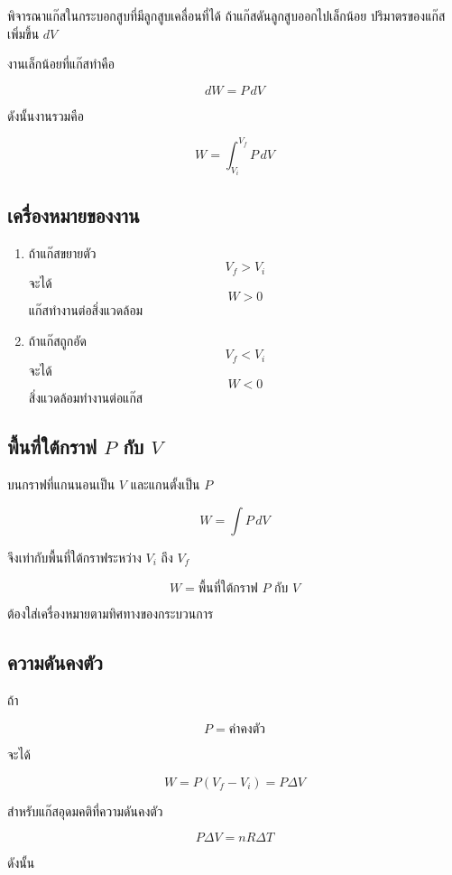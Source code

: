 พิจารณาแก๊สในกระบอกสูบที่มีลูกสูบเคลื่อนที่ได้ ถ้าแก๊สดันลูกสูบออกไปเล็กน้อย ปริมาตรของแก๊สเพิ่มขึ้น $dV$

งานเล็กน้อยที่แก๊สทำคือ

\[
\boxed{dW=P\,dV}
\]

ดังนั้นงานรวมคือ

\[
\boxed{
W
=
\int_{V_i}^{V_f}P\,dV
}
\]

\subsection{เครื่องหมายของงาน}

\begin{enumerate}
    \item ถ้าแก๊สขยายตัว
    \[
    V_f>V_i
    \]
    จะได้
    \[
    W>0
    \]
    แก๊สทำงานต่อสิ่งแวดล้อม

    \item ถ้าแก๊สถูกอัด
    \[
    V_f<V_i
    \]
    จะได้
    \[
    W<0
    \]
    สิ่งแวดล้อมทำงานต่อแก๊ส
\end{enumerate}

\subsection{พื้นที่ใต้กราฟ $P$ กับ $V$}

บนกราฟที่แกนนอนเป็น $V$ และแกนตั้งเป็น $P$

\[
W
=
\int P\,dV
\]

จึงเท่ากับพื้นที่ใต้กราฟระหว่าง $V_i$ ถึง $V_f$

\begin{tcolorbox}[title=งานจากกราฟ $P$ กับ $V$]
\[
\boxed{
W=\text{พื้นที่ใต้กราฟ }P\text{ กับ }V
}
\]

ต้องใส่เครื่องหมายตามทิศทางของกระบวนการ
\end{tcolorbox}

\subsection{ความดันคงตัว}

ถ้า

\[
P=\text{ค่าคงตัว}
\]

จะได้

\[
\boxed{
W
=P(V_f-V_i)
=P\Delta V
}
\]

สำหรับแก๊สอุดมคติที่ความดันคงตัว

\[
P\Delta V=nR\Delta T
\]

ดังนั้น


